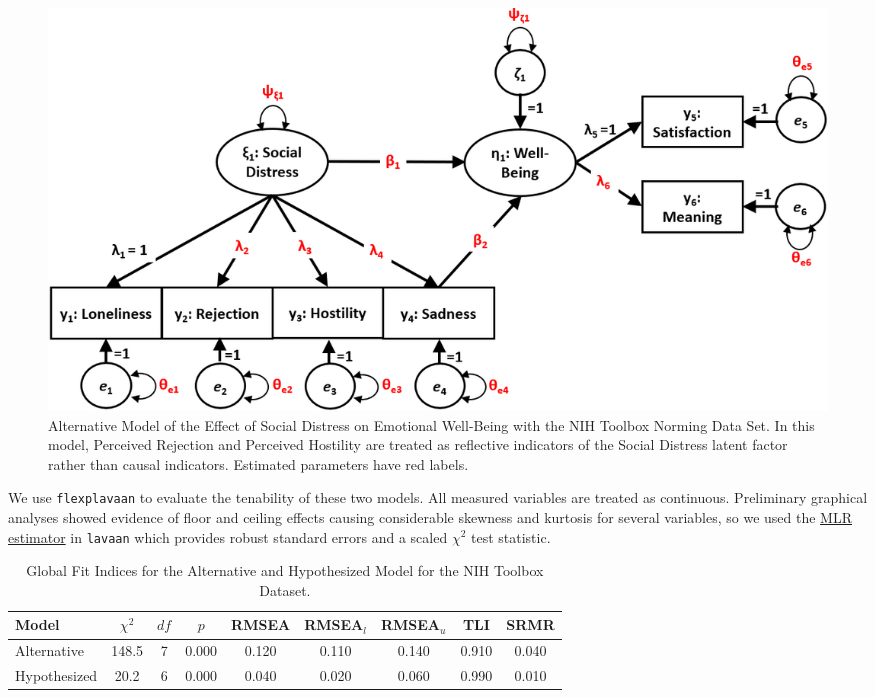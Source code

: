 \documentclass[
  english,
  man]{apa6}
\begin{document}
\begin{figure}

{\centering \includegraphics[width=0.9\linewidth]{toolboxDiagramAlternative} 

}

\caption{Alternative Model of the Effect of Social Distress on Emotional Well-Being with the NIH Toolbox Norming Data Set. In this model, Perceived Rejection and Perceived Hostility are treated as reflective indicators of the Social Distress latent factor rather than causal indicators. Estimated parameters have red labels.}\label{fig:toolbox2}
\end{figure}

We use \texttt{flexplavaan} to evaluate the tenability of these two models. All measured variables are treated as continuous. Preliminary graphical analyses showed evidence of floor and ceiling effects causing considerable skewness and kurtosis for several variables, so we used the \href{https://lavaan.ugent.be/tutorial/est.html}{MLR estimator} in \texttt{lavaan} which provides robust standard errors and a scaled \(\chi^2\) test statistic.

\begin{table}[tbp]

\begin{center}
\begin{threeparttable}

\caption{\label{tab:fitapplied}Global Fit Indices for the Alternative and Hypothesized Model for the NIH Toolbox Dataset.}

\begin{tabular}{lcccccccc}
\toprule
Model & $\chi^2$ & $df$ & $p$ & RMSEA & RMSEA$_{l}$ & RMSEA$_{u}$ & TLI & SRMR\\
\midrule
Alternative & 148.5 & 7 & 0.000 & 0.120 & 0.110 & 0.140 & 0.910 & 0.040\\
Hypothesized & 20.2 & 6 & 0.000 & 0.040 & 0.020 & 0.060 & 0.990 & 0.010\\
\bottomrule
\end{tabular}

\end{threeparttable}
\end{center}

\end{table}
\end{document}
